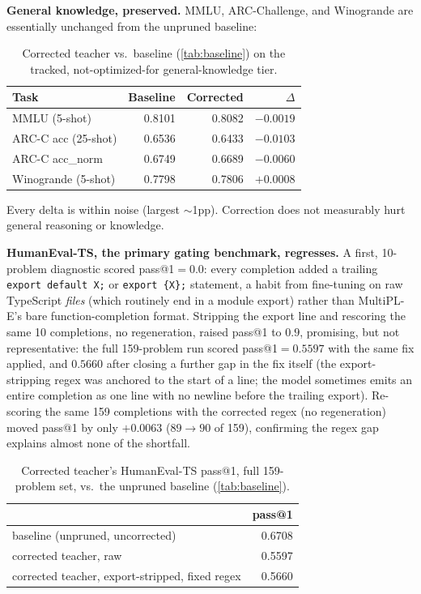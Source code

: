 \documentclass{article}
\theoremstyle{plain}
\theoremstyle{definition}
\theoremstyle{remark}
\begin{document}
\textbf{General knowledge, preserved.} MMLU, ARC-Challenge, and
Winogrande are essentially unchanged from the unpruned baseline:

\begin{table}[t]
\centering
\scriptsize
\setlength{\tabcolsep}{3pt}
\begin{tabular}{lrrr}
\toprule
Task & Baseline & Corrected & $\Delta$ \\
\midrule
MMLU (5-shot) & 0.8101 & 0.8082 & $-0.0019$ \\
ARC-C acc (25-shot) & 0.6536 & 0.6433 & $-0.0103$ \\
ARC-C acc\_norm & 0.6749 & 0.6689 & $-0.0060$ \\
Winogrande (5-shot) & 0.7798 & 0.7806 & $+0.0008$ \\
\bottomrule
\end{tabular}
\caption{Corrected teacher vs.\ baseline (\cref{tab:baseline}) on the
tracked, not-optimized-for general-knowledge tier.}
\label{tab:teacher-correction-general-knowledge}
\end{table}

Every delta is within noise (largest $\sim$1pp). Correction does not
measurably hurt general reasoning or knowledge.

\textbf{HumanEval-TS, the primary gating benchmark, regresses.} A first,
10-problem diagnostic scored pass@1$=0.0$: every completion added a
trailing \texttt{export default X;} or \texttt{export \{X\};} statement,
a habit from fine-tuning on raw TypeScript \emph{files} (which routinely
end in a module export) rather than MultiPL-E's bare function-completion
format. Stripping the export line and rescoring the same 10 completions,
no regeneration, raised pass@1 to $0.9$, promising, but not
representative: the full 159-problem run scored pass@1$=0.5597$ with the
same fix applied, and $0.5660$ after closing a further gap in the fix
itself (the export-stripping regex was anchored to the start of a line;
the model sometimes emits an entire completion as one line with no
newline before the trailing export). Re-scoring the same 159 completions
with the corrected regex (no regeneration) moved pass@1 by only
$+0.0063$ ($89 \to 90$ of 159), confirming the regex gap explains almost
none of the shortfall.

\begin{table}[t]
\centering
\scriptsize
\setlength{\tabcolsep}{3pt}
\begin{tabular}{lr}
\toprule
& pass@1 \\
\midrule
baseline (unpruned, uncorrected) & 0.6708 \\
corrected teacher, raw & 0.5597 \\
corrected teacher, export-stripped, fixed regex & 0.5660 \\
\bottomrule
\end{tabular}
\caption{Corrected teacher's HumanEval-TS pass@1, full 159-problem set,
vs.\ the unpruned baseline (\cref{tab:baseline}).}
\label{tab:teacher-correction-humaneval}
\end{table}
\end{document}
